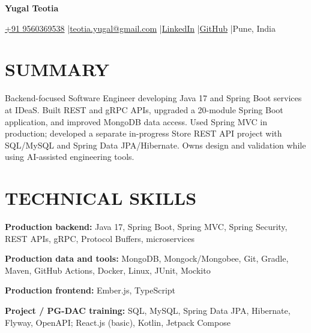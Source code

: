 \documentclass[a4paper,10pt]{article}
\begin{document}
{\centering
{\fontsize{19}{22}\selectfont\bfseries Yugal Teotia}\par
\vspace{5pt}
{\small \href{tel:+919560369538}{+91 9560369538} \enspace|\enspace \href{mailto:teotia.yugal@gmail.com}{teotia.yugal@gmail.com} \enspace|\enspace \href{https://www.linkedin.com/in/yugalteotia/}{LinkedIn} \enspace|\enspace \href{https://github.com/yugalteotia}{GitHub} \enspace|\enspace Pune, India}\par
}

\section{SUMMARY}
Backend-focused Software Engineer developing Java 17 and Spring Boot services at IDeaS. Built REST and gRPC APIs, upgraded a 20-module Spring Boot application, and improved MongoDB data access. Used Spring MVC in production; developed a separate in-progress Store REST API project with SQL/MySQL and Spring Data JPA/Hibernate. Owns design and validation while using AI-assisted engineering tools.

\section{TECHNICAL SKILLS}
\textbf{Production backend:} Java 17, Spring Boot, Spring MVC, Spring Security, REST APIs, gRPC, Protocol Buffers, microservices\par\vspace{2pt}
\textbf{Production data and tools:} MongoDB, Mongock/Mongobee, Git, Gradle, Maven, GitHub Actions, Docker, Linux, JUnit, Mockito\par\vspace{2pt}
\textbf{Production frontend:} Ember.js, TypeScript\par\vspace{2pt}
\textbf{Project / PG-DAC training:} SQL, MySQL, Spring Data JPA, Hibernate, Flyway, OpenAPI; React.js (basic), Kotlin, Jetpack Compose
\end{document}
